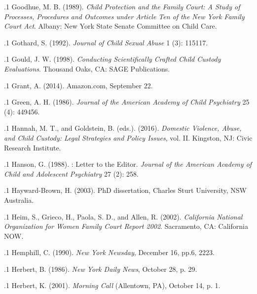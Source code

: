 \documentclass[11pt, twoside]{article}
\begin{document}
{\p.1{%
Goodhue, M. B. (1989). \textit{Child Protection and the Family Court: A Study of Processes,
Procedures and Outcomes under Article Ten of the New York Family Court Act}.
Albany: New York State Senate Committee on Child Care.
}%

\p.1{%
Gothard, S. (1992).  \textit{Journal of Child
Sexual Abuse} 1 (3): 115\ndash{}117.
}%

\p.1{%
Gould, J. W. (1998). \textit{Conducting Scientifically Crafted Child Custody Evaluations}.
Thousand Oaks, CA: SAGE Publications.
}%

\p.1{%
Grant, A. (2014).  Amazon.com, September 22.
}%

\p.1{%
Green, A. H. (1986).  \textit{Journal of the American Academy of Child Psychiatry} 25 (4): 449\ndash{}456.
}%

\p.1{%
Hannah, M. T., and Goldstein, B. (eds.). (2016). \textit{Domestic Violence, Abuse, and Child
Custody: Legal Strategies and Policy Issues}, vol. II. Kingston, NJ: Civic Research
Institute.
}%

\p.1{%
Hanson, G. (1988). : Letter to the Editor. \textit{Journal of the
American Academy of Child and Adolescent Psychiatry} 27 (2): 258.
}%

\p.1{%
Hayward-Brown, H. (2003). 
PhD dissertation, Charles Sturt University, NSW Australia.
}%

\p.1{%
Heim, S., Grieco, H., Paola, S. D., and Allen, R. (2002). \textit{California National Organization for Women Family Court Report 2002}. Sacramento, CA: California
NOW.
}%

\p.1{%
Hemphill, C. (1990).  \textit{New York Newsday}, December 16, pp.\@ 6, 22\ndash{}23.
}%

\p.1{%
Herbert, B. (1986).  \textit{New York Daily News}, October 28,
p. 29.
}%

\p.1{%
Herbert, K. (2001).  \textit{Morning Call} (Allentown, PA), October 14, p. 1.
}%

}
\end{document}
